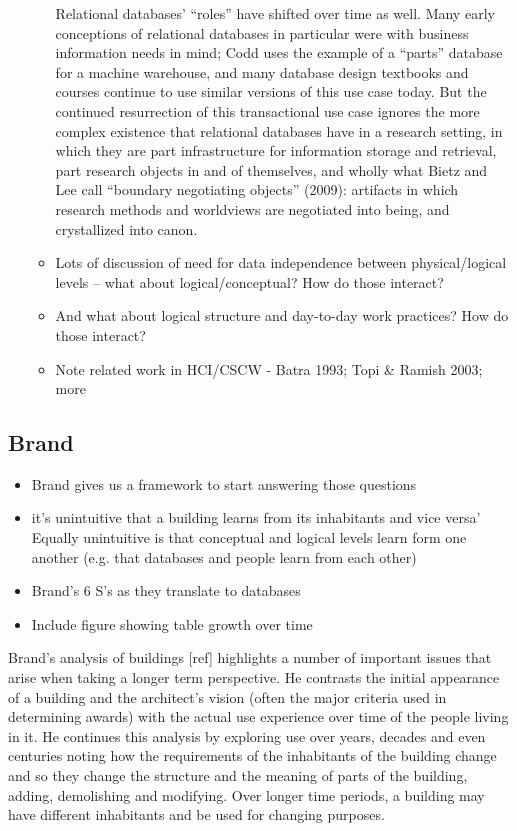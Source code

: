 \begin{itemize}
\begin{itemize}
Relational databases’ “roles” have shifted over time as well. Many early conceptions of relational databases in particular were with business information needs in mind; Codd uses the example of a “parts” database for a machine warehouse, and many database design textbooks and courses continue to use similar versions of this use case today.  But the continued resurrection of this transactional use case ignores the more complex existence that relational databases have in a research setting, in which they are part infrastructure for information storage and retrieval, part research objects in and of themselves, and wholly what Bietz and Lee call “boundary negotiating objects” (2009): artifacts in which research methods and worldviews are negotiated into being, and crystallized into canon.  

\item Lots of discussion of need for data independence between physical/logical levels – what about logical/conceptual? How do those interact?
\item And what about logical structure and day-to-day work practices? How do those interact?
\item Note related work in HCI/CSCW - Batra 1993; Topi & Ramish 2003; more
\end{itemize}
\end{itemize}

\subsection{Brand}

\begin{itemize}
\item Brand gives us a framework to start answering those questions
\item	it's unintuitive that a building learns from its inhabitants and vice versa’ Equally unintuitive is that conceptual and logical levels learn form one another (e.g. that databases and people learn from each other)
\item Brand’s 6 S’s as they translate to databases
\item Include figure showing table growth over time
\end{itemize}


Brand’s analysis of buildings [ref] highlights a number of important issues that arise when taking a longer term perspective. He contrasts the initial appearance of a building and the architect’s vision (often the major criteria used in determining awards) with the actual use experience over time of the people living in it. He continues this analysis by exploring use over years, decades and even centuries noting how the requirements of the inhabitants of the building change and so they change the structure and the meaning of parts of the building, adding, demolishing and modifying. Over longer time periods, a building may have different inhabitants and be used for changing purposes. 

